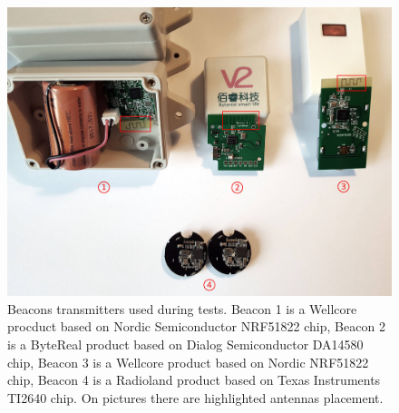 \documentclass[../main.tex]{subfiles}
\begin{document}
\begin{figure}[!htbp]
\includegraphics[width=\textwidth, keepaspectratio]{pictures/beacons_used_in_tests.pdf}
\centering
\caption{Beacons transmitters used during tests. Beacon 1 is a Wellcore procduct based on Nordic Semiconductor NRF51822 chip, Beacon 2 is a ByteReal product based on Dialog Semiconductor DA14580 chip, Beacon 3 is a Wellcore product based on Nordic NRF51822 chip, Beacon 4 is a Radioland product based on Texas Instruments TI2640 chip. On pictures there are highlighted antennas placement.}
\label{fig:beacons_used_in_tests}
\end{figure}
\end{document}
